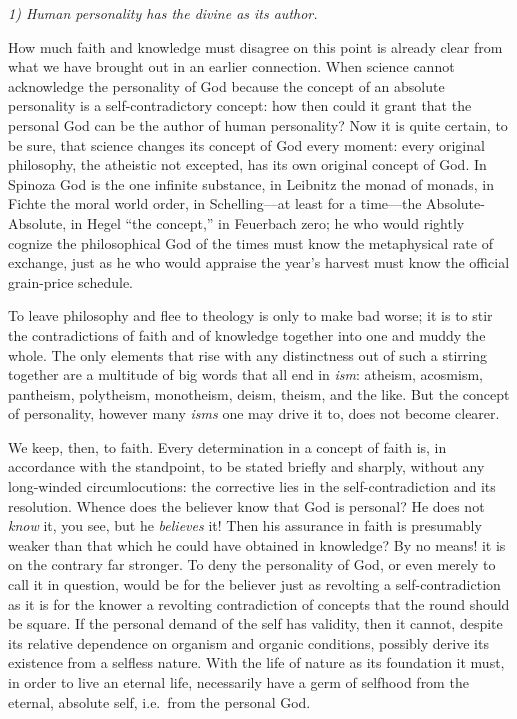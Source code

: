 \documentclass[12pt]{book}
\newcommand{\opage}[1]{\marginnote{\footnotesize\textit{[#1]}}}
\begin{document}
\textit{1) Human personality has the divine as its author.}

How much faith and knowledge must disagree on this point is already
clear from what we have brought out in an earlier connection. When
science cannot acknowledge the personality of God because the concept
of an absolute personality is a self-contradictory concept: how then
could it grant that the
\opage{141}\setcounter{footnote}{0}%
personal God can be the author of human personality? Now it is quite
certain, to be sure, that science changes its concept of God every
moment: every original philosophy, the atheistic not excepted, has its
own original concept of God. In Spinoza God is the one infinite
substance, in Leibnitz the monad of monads, in Fichte the moral world
order, in Schelling---at least for a time---the Absolute-Absolute, in
Hegel ``the concept,'' in Feuerbach zero; he who would rightly cognize
the philosophical God of the times must know the metaphysical rate of
exchange, just as he who would appraise the year's harvest must know
the official grain-price schedule.

To leave philosophy and flee to theology is only to make bad worse; it
is to stir the contradictions of faith and of knowledge together into
one and muddy the whole. The only elements that rise with any
distinctness out of such a stirring together are a multitude of big
words that all end in \textit{ism}: atheism, acosmism, pantheism,
polytheism, monotheism, deism, theism, and the like. But the concept of
personality, however many \textit{isms} one may drive it to, does not
become clearer.

We keep, then, to faith. Every determination in a concept of faith is,
in accordance with the standpoint, to be stated briefly and sharply,
without any long-winded circumlocutions: the corrective lies in the
self-contradiction and its resolution. Whence does the believer know
that God is personal? He does not \textit{know} it, you see, but he
\textit{believes} it! Then his assurance in faith is presumably weaker
than that which he could have obtained in knowledge? By no means! it is
on the contrary far stronger. To deny the personality of God, or even
merely to call it in question, would be for the believer just as
revolting a self-contradiction as it is for the knower a revolting
contradiction of concepts that the round should be square. If the
personal demand of the self has validity, then it cannot,
\opage{142}\setcounter{footnote}{0}%
despite its relative dependence on organism and organic conditions,
possibly derive its existence from a selfless nature. With the life of
nature as its foundation it must, in order to live an eternal life,
necessarily have a germ of selfhood from the eternal, absolute self,
i.e.\ from the personal God.
\end{document}

